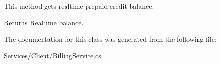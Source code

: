 This method gets realtime prepaid credit balance. 

\begin{DoxyReturn}{Returns}
Realtime balance.
\end{DoxyReturn}


The documentation for this class was generated from the following file\+:\begin{DoxyCompactItemize}
\item 
Services/\+Client/Billing\+Service.\+cs\end{DoxyCompactItemize}
